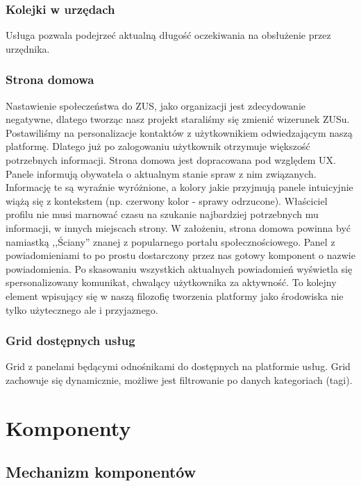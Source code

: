 \documentclass[licencjacka]{pracamgr}
\begin{document}
\subsubsection{Kolejki w urzędach}
Usługa pozwala podejrzeć aktualną długość oczekiwania na obsłużenie przez urzędnika.

\subsubsection{Strona domowa}
Nastawienie społeczeństwa do ZUS, jako organizacji jest zdecydowanie negatywne, dlatego tworząc nasz projekt staraliśmy się
zmienić wizerunek ZUSu. Postawiliśmy na personalizacje kontaktów z użytkownikiem odwiedzającym naszą platformę. Dlatego już po zalogowaniu
użytkownik otrzymuje większość potrzebnych informacji. Strona domowa jest dopracowana pod względem UX. Panele informują
obywatela o aktualnym stanie spraw z nim związanych. Informację te są wyraźnie wyróżnione, a kolory jakie przyjmują panele
intuicyjnie wiążą się z kontekstem (np. czerwony kolor - sprawy odrzucone). Właściciel profilu nie musi marnować czasu
na szukanie najbardziej potrzebnych mu informacji, w innych miejscach strony. W założeniu, strona domowa powinna być
namiastką ,,Ściany'' znanej z popularnego portalu społecznościowego. Panel z powiadomieniami to po prostu dostarczony
przez nas gotowy komponent o nazwie powiadomienia. Po skasowaniu wszystkich aktualnych powiadomień wyświetla się spersonalizowany
komunikat, chwalący użytkownika za aktywność. To kolejny element wpisujący się w naszą filozofię tworzenia platformy jako
środowiska nie tylko użytecznego ale i przyjaznego.

\subsubsection{Grid dostępnych usług}
Grid z panelami będącymi odnośnikami do dostępnych na platformie usług. Grid zachowuje się dynamicznie,
możliwe jest filtrowanie po danych kategoriach (tagi).

\section{Komponenty}
\subsection{Mechanizm komponentów}
\end{document}
